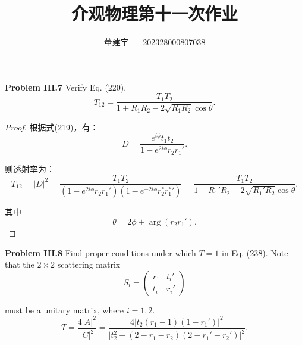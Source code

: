 \documentclass[reqno,a4paper,12pt]{amsart}
\title{介观物理第十一次作业}
\author{董建宇 ~~ 202328000807038}
\begin{document}
\maketitle
\titleformat{\section}[hang]{\small}{\thesection}{0.8em}{}{}
\titleformat{\subsection}[hang]{\small}{\thesubsection}{0.8em}{}{}

\textbf{Problem III.7} Verify Eq. (220).
\[
	T_{12} = \frac{T_1T_2}{1+R_1R_2-2\sqrt{R_1R_2}\cos\theta}. \tag{220}
\]

\begin{proof}
根据式(219)，有：
\[
	D = \frac{e^{i\phi} t_1t_2}{1-e^{2i\phi} r_2r_1'}.
\]

则透射率为：
\[
	T_{12} = \vert D \vert^2 = \frac{T_1T_2}{(1-e^{2i\phi} r_2r_1')(1-e^{-2i\phi} r_2^*{r_1^*}')} = \frac{T_1T_2}{1 + R_1'R_2 - 2\sqrt{R_1'R_2}\cos\theta}.
\]

其中
\[
	\theta = 2\phi + \arg(r_2r_1').
\]
\end{proof}


\textbf{Problem III.8} Find proper conditions under which $T=1$ in Eq. (238). Note that the $2\times 2$ scattering matrix
\[
	S_i = \left( \begin{matrix}
		r_1 & t_i' \\
		t_i & r_i'
	\end{matrix} \right)
\]

must be a unitary matrix, where $i=1,2$.
\[
	T = \frac{4\vert A \vert^2}{\vert C \vert^2} = \frac{4\vert t_2 (r_1-1) (1-r_1') \vert^2}{\vert t_2^2 - (2-r_1-r_2)(2-r_1'-r_2') \vert^2}. \tag{238}
\]
\end{document}

